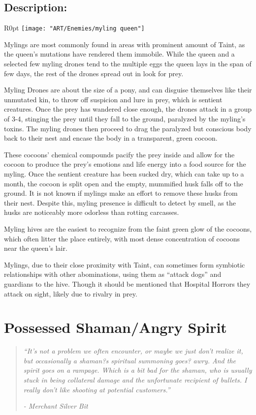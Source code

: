 \documentclass[11pt,a4paper,twocolumn]{book}
\begin{document}
	\subsection*{Description:}
	
	\begin{wrapfigure}{R}{0pt}
		\texttt{[image: "ART/Enemies/myling queen"]}
	\end{wrapfigure}
	
	Mylings are most commonly found in areas with prominent amount of Taint, as the queen's mutations have rendered them immobile. While the queen and a selected few myling drones tend to the multiple eggs the queen lays in the span of few days, the rest of the drones spread out in look for prey.
	
	\bigskip
	Myling Drones are about the size of a pony, and can disguise themselves like their unmutated kin, to throw off suspicion and lure in prey, which is sentient creatures. Once the prey has wandered close enough, the drones attack in a group of 3-4, stinging the prey until they fall to the ground, paralyzed by the myling's toxins. The myling drones then proceed to drag the paralyzed but conscious body back to their nest and encase the body in a transparent, green cocoon. 
	
	These cocoons' chemical compounds pacify the prey inside and allow for the cocoon to produce the prey's emotions and life energy into a food source for the myling. Once the sentient creature has been sucked dry, which can take up to a month, the cocoon is split open and the empty, mummified husk falls off to the ground. It is not known if mylings make an effort to remove these husks from their nest. 
	Despite this, myling presence is difficult to detect by smell, as the husks are noticeably more odorless than rotting carcasses.
	
	\bigskip
	Myling hives are the easiest to recognize from the faint green glow of the cocoons, which often litter the place entirely, with most dense concentration of cocoons near the queen's lair.
	
	Mylings, due to their close proximity with Taint, can sometimes form symbiotic relationships with other abominations, using them as ``attack dogs'' and guardians to the hive. Though it should be mentioned that Hospital Horrors they attack on sight, likely due to rivalry in prey.
	
	\clearpage
	
	\section*{Possessed Shaman/Angry Spirit}
	\begin{quote}
		\emph{``It's not a problem we often encounter, or maybe we just don't realize it, but occasionally a shaman?s spiritual summoning goes? awry. And the spirit goes on a rampage. Which is a bit bad for the shaman, who is usually stuck in being collateral damage and the unfortunate recipient of bullets. I really don't like shooting at potential customers.''}
		
		\emph{-	Merchant Silver Bit}
	\end{quote}
	
\end{document}
